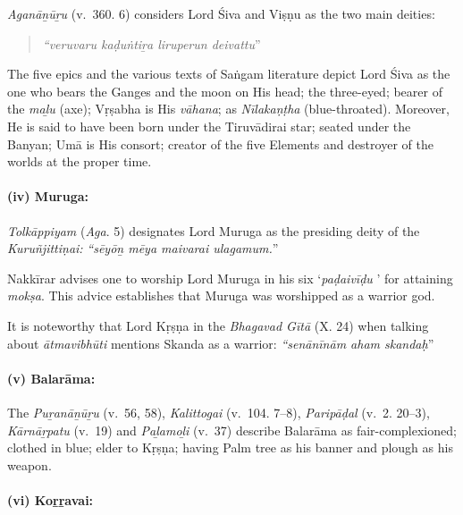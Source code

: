 \vskip -7.5pt

\textit{Aganāṉūṟu} (v.~360. 6) considers Lord Śiva and Viṣṇu as the two main deities:

\begin{quote}
\textit{“veruvaru kaḍuṅtiṟa liruperun deivattu}”
\end{quote}

The five epics and the various texts of Saṅgam literature depict Lord Śiva as the one who bears the Ganges and the moon on His head; the three-eyed; bearer of the \textit{maḻu} (axe); Vṛṣabha is His \textit{vāhana}; as \textit{Nīlakaṇṭha} (blue-throated). Moreover, He is said to have been born under the Tiruvādirai star; seated under the Banyan; Umā is His consort; creator of the five Elements and destroyer of the worlds at the proper time.


\paragraph*{(iv) Muruga:}

\vskip -7.5pt

\textit{Tolkāppiyam} (\textit{Aga}. 5) designates Lord Muruga as the presiding deity of the \textit{Kuruñjittiṇai:} \textit{“sēyōṉ mēya maivarai ulagamum.}”

Nakkīrar advises one to worship Lord Muruga in his six ‘\textit{paḍaivīḍu} ’ for attaining \textit{mokṣa}. This advice establishes that Muruga was worshipped as a warrior god.

It is noteworthy that Lord Kṛṣṇa in the \textit{Bhagavad Gītā} (X. 24) when talking about \textit{ātmavibhūti} mentions Skanda as a warrior: \textit{“senānīnām aham skandaḥ}”


\paragraph*{(v) Balarāma:}

\vskip -7.5pt

The \textit{Puṟanāṉūṟu} (v.~56, 58), \textit{Kalittogai} (v.~104. 7–8), \textit{Paripāḍal} (v.~2. 20–3), \textit{Kārnāṟpatu} (v.~19) and \textit{Paḻamoḻi} (v.~37) describe Balarāma as fair-complexioned; clothed in blue; elder to Kṛṣṇa; having Palm tree as his banner and plough as his weapon.


\paragraph*{(vi) Koṟṟavai:}

